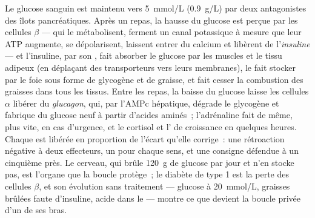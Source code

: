 \begin{proposition}\label{prop:b2:cell-signalling:glucose}
Le glucose sanguin est maintenu vers \qty{5}{mmol/L} (\qty{0.9}{g/L})
par deux  antagonistes des îlots pancréatiques. Après un repas,
la hausse du glucose est perçue par les cellules $\beta$ --- qui le
métabolisent, ferment un canal potassique à mesure que leur ATP
augmente, se dépolarisent, laissent entrer du calcium et libèrent de
l'\emph{insuline} --- et l'insuline, par son , fait absorber le glucose par les muscles et le tissu
adipeux (en déplaçant des transporteurs vers leurs membranes), le fait
stocker par le foie sous forme de glycogène et de graisse, et fait cesser
la combustion des graisses dans tous les tissus. Entre les repas, la
baisse du glucose laisse les cellules $\alpha$ libérer du
\emph{glucagon}, qui, par l'AMPc hépatique, dégrade le glycogène et
fabrique du glucose neuf à partir d'acides aminés~; l'adrénaline fait de
même, plus vite, en cas d'urgence, et le cortisol et l' de
croissance en quelques heures. Chaque  est libérée en proportion
de l'écart qu'elle corrige~: une rétroaction négative à deux effecteurs,
un pour chaque sens, et une consigne défendue à un cinquième près. Le
cerveau, qui brûle \qty{120}{g} de glucose par jour et n'en stocke pas,
est l'organe que la boucle protège~; le diabète de type 1 est la perte
des cellules $\beta$, et son évolution sans traitement --- glucose à
\qty{20}{mmol/L}, graisses brûlées faute d'insuline, acide dans le 
--- montre ce que devient la boucle privée d'un de ses bras.
\end{proposition}

